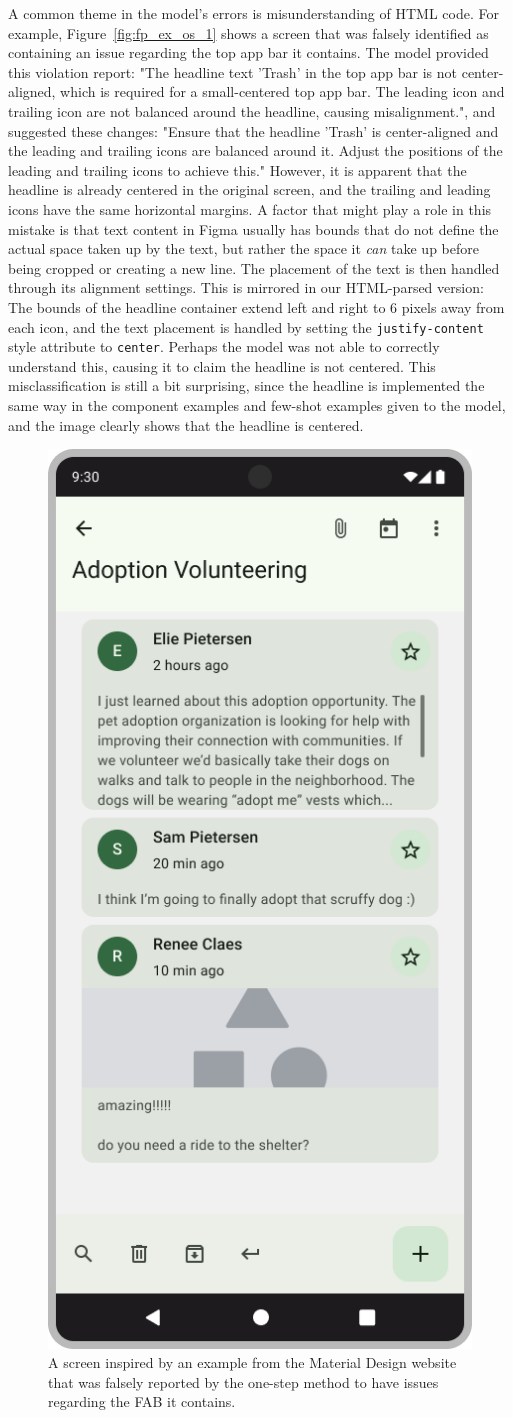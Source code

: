 \documentclass[11pt,titlepage,oneside,openany]{book}
\begin{document}
A common theme in the model's errors is misunderstanding of HTML code. For example, Figure~\ref{fig:fp_ex_os_1} shows a screen that was falsely identified as containing an issue regarding the top app bar it contains. The model provided this violation report: "The headline text 'Trash' in the top app bar is not center-aligned, which is required for a small-centered top app bar. The leading icon and trailing icon are not balanced around the headline, causing misalignment.", and suggested these changes: "Ensure that the headline 'Trash' is center-aligned and the leading and trailing icons are balanced around it. Adjust the positions of the leading and trailing icons to achieve this." However, it is apparent that the headline is already centered in the original screen, and the trailing and leading icons have the same horizontal margins. A factor that might play a role in this mistake is that text content in Figma usually has bounds that do not define the actual space taken up by the text, but rather the space it \emph{can} take up before being cropped or creating a new line. The placement of the text is then handled through its alignment settings. This is mirrored in our HTML-parsed version: The bounds of the headline container extend left and right to 6 pixels away from each icon, and the text placement is handled by setting the \texttt{justify-content} style attribute to \texttt{center}. Perhaps the model was not able to correctly understand this, causing it to claim the headline is not centered. This misclassification is still a bit surprising, since the headline is implemented the same way in the component examples and few-shot examples given to the model, and the image clearly shows that the headline is centered. 

\begin{figure}[t]
	\centering
	\includegraphics[width=.28\textwidth]{figures/fp_ex_os_3.jpg}
	\caption{A screen inspired by an example from the Material Design website that was falsely reported by the one-step method to have issues regarding the FAB it contains.}
	\label{fig:fp_ex_os_3}
\end{figure}
\end{document}
